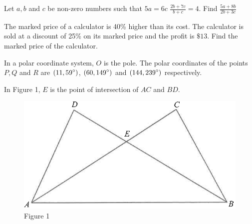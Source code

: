 \documentclass[11pt,paper=a4,answers]{exam}
\begin{document}
\begin{questions}
\vspace{0.5cm}
\label{Q5: Ratios}
\question[4]
    Let $\displaystyle a, b$ and  $\displaystyle c$ be non-zero numbers such that 
    $\displaystyle 5a = 6c$
    $\displaystyle \frac{2b + 7c}{b + c} = 4$.
    Find 
    $\displaystyle \frac{5a + 8b}{2b + 3c}$
    \droppoints

\vspace{0.5cm}
\label{Q6: Percentages}
\question[4]
    The marked price of a calculator is 40\% higher than its cost. The calculator is sold at a discount of 25\% on its marked price and the profit is $\$13$. 
    Find the marked price of the calculator.
    \droppoints

\newpage
\vspace{0.5cm}
\label{Q7: Polar}
\question[4]
    In a polar coordinate system, $
    \displaystyle O$ is the pole. The polar coordinates of the points $\displaystyle P, Q$ and $\displaystyle R$ are
    $\displaystyle(11, 59\degree)$, $\displaystyle (60, 149\degree)$ and $\displaystyle (144, 239\degree)$ respectively.

    \droppoints

\vspace{0.5cm}
\label{Q8: Congruence & Pyth}
\question[5]
    In Figure 1, $ \displaystyle E$ is the point of intersection of $\displaystyle AC$ and $\displaystyle BD$. 

    \begin{figure}[ht]
        \centering
        \includegraphics[width=0.5\linewidth]{figure_1.png}
        \caption*{Figure 1}
    \end{figure}


\end{questions}
\end{document}
